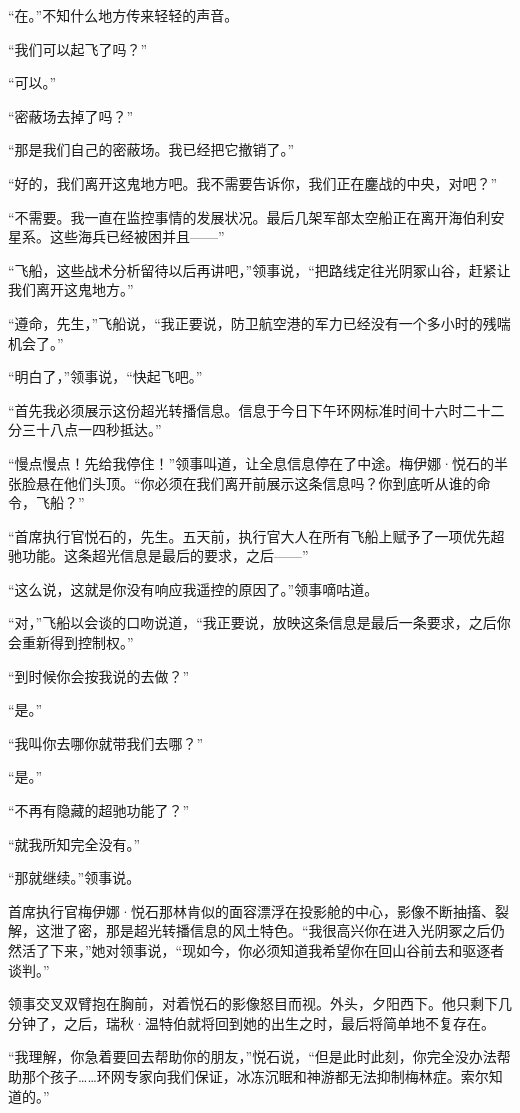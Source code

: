 \documentclass[AutoFakeBold=true]{book}
\begin{document}
``在。''不知什么地方传来轻轻的声音。

``我们可以起飞了吗？''

``可以。''

``密蔽场去掉了吗？''

``那是我们自己的密蔽场。我已经把它撤销了。''

``好的，我们离开这鬼地方吧。我不需要告诉你，我们正在鏖战的中央，对吧？''

``不需要。我一直在监控事情的发展状况。最后几架军部太空船正在离开海伯利安星系。这些海兵已经被困并且——''

``飞船，这些战术分析留待以后再讲吧，''领事说，``把路线定往光阴冢山谷，赶紧让我们离开这鬼地方。''

``遵命，先生，''飞船说，``我正要说，防卫航空港的军力已经没有一个多小时的残喘机会了。''

``明白了，''领事说，``快起飞吧。''

``首先我必须展示这份超光转播信息。信息于今日下午环网标准时间十六时二十二分三十八点一四秒抵达。''

``慢点慢点！先给我停住！''领事叫道，让全息信息停在了中途。梅伊娜·悦石的半张脸悬在他们头顶。``你必须在我们离开前展示这条信息吗？你到底听从谁的命令，飞船？''

``首席执行官悦石的，先生。五天前，执行官大人在所有飞船上赋予了一项优先超驰功能。这条超光信息是最后的要求，之后——''

``这么说，这就是你没有响应我遥控的原因了。''领事嘀咕道。

``对，''飞船以会谈的口吻说道，``我正要说，放映这条信息是最后一条要求，之后你会重新得到控制权。''

``到时候你会按我说的去做？''

``是。''

``我叫你去哪你就带我们去哪？''

``是。''

``不再有隐藏的超驰功能了？''

``就我所知完全没有。''

``那就继续。''领事说。

首席执行官梅伊娜·悦石那林肯似的面容漂浮在投影舱的中心，影像不断抽搐、裂解，这泄了密，那是超光转播信息的风土特色。``我很高兴你在进入光阴冢之后仍然活了下来，''她对领事说，``现如今，你必须知道我希望你在回山谷前去和驱逐者谈判。''

领事交叉双臂抱在胸前，对着悦石的影像怒目而视。外头，夕阳西下。他只剩下几分钟了，之后，瑞秋·温特伯就将回到她的出生之时，最后将简单地不复存在。

``我理解，你急着要回去帮助你的朋友，''悦石说，``但是此时此刻，你完全没办法帮助那个孩子……环网专家向我们保证，冰冻沉眠和神游都无法抑制梅林症。索尔知道的。''
\end{document}
